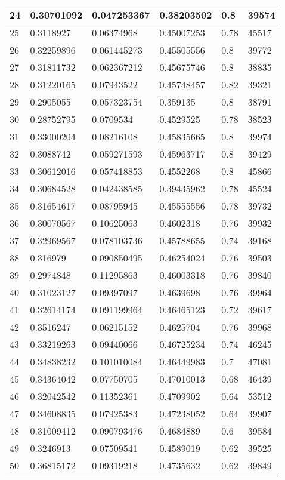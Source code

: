 \begin{longtable}{|l|l|l|l|l|l|}
24 & 0.30701092 & 0.047253367 & 0.38203502 & 0.8 & 39574 \\ \hline 
25 & 0.3118927 & 0.06374968 & 0.45007253 & 0.78 & 45517 \\ \hline 
26 & 0.32259896 & 0.061445273 & 0.45505556 & 0.8 & 39772 \\ \hline 
27 & 0.31811732 & 0.062367212 & 0.45675746 & 0.8 & 38835 \\ \hline 
28 & 0.31220165 & 0.07943522 & 0.45748457 & 0.82 & 39321 \\ \hline 
29 & 0.2905055 & 0.057323754 & 0.359135 & 0.8 & 38791 \\ \hline 
30 & 0.28752795 & 0.0709534 & 0.4529525 & 0.78 & 38523 \\ \hline 
31 & 0.33000204 & 0.08216108 & 0.45835665 & 0.8 & 39974 \\ \hline 
32 & 0.3088742 & 0.059271593 & 0.45963717 & 0.8 & 39429 \\ \hline 
33 & 0.30612016 & 0.057418853 & 0.4552268 & 0.8 & 45866 \\ \hline 
34 & 0.30684528 & 0.042438585 & 0.39435962 & 0.78 & 45524 \\ \hline 
35 & 0.31654617 & 0.08795945 & 0.45555556 & 0.78 & 39732 \\ \hline 
36 & 0.30070567 & 0.10625063 & 0.4602318 & 0.76 & 39932 \\ \hline 
37 & 0.32969567 & 0.078103736 & 0.45788655 & 0.74 & 39168 \\ \hline 
38 & 0.316979 & 0.090850495 & 0.46254024 & 0.76 & 39503 \\ \hline 
39 & 0.2974848 & 0.11295863 & 0.46003318 & 0.76 & 39840 \\ \hline 
40 & 0.31023127 & 0.09397097 & 0.4639698 & 0.76 & 39964 \\ \hline 
41 & 0.32614174 & 0.091199964 & 0.46465123 & 0.72 & 39617 \\ \hline 
42 & 0.3516247 & 0.06215152 & 0.4625704 & 0.76 & 39968 \\ \hline 
43 & 0.33219263 & 0.09440066 & 0.46725234 & 0.74 & 46245 \\ \hline 
44 & 0.34838232 & 0.101010084 & 0.46449983 & 0.7 & 47081 \\ \hline 
45 & 0.34364042 & 0.07750705 & 0.47010013 & 0.68 & 46439 \\ \hline 
46 & 0.32042542 & 0.11352361 & 0.4709902 & 0.64 & 53512 \\ \hline 
47 & 0.34608835 & 0.07925383 & 0.47238052 & 0.64 & 39907 \\ \hline 
48 & 0.31009412 & 0.090793476 & 0.4684889 & 0.6 & 39584 \\ \hline 
49 & 0.3246913 & 0.07509541 & 0.4589019 & 0.62 & 39525 \\ \hline 
50 & 0.36815172 & 0.09319218 & 0.4735632 & 0.62 & 39849 \\ \hline 
\end{longtable}